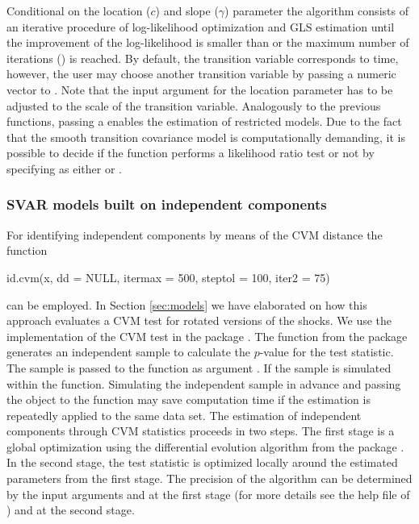 \documentclass[nojss]{jss}\usepackage[]{graphicx}\usepackage[]{color}
\begin{document}
Conditional on the location ($c$) and slope ($\gamma$) parameter the algorithm consists of an iterative procedure of log-likelihood optimization and GLS estimation until the improvement of the log-likelihood is smaller than  or the maximum number of iterations () is reached. By default, the transition variable corresponds to time, however, the user may choose another transition variable by passing a numeric vector to . Note that the input argument for the location parameter has to be adjusted to the scale of the transition variable. Analogously to the previous functions, passing a  enables the estimation of restricted models. Due to the fact that the smooth transition covariance model is computationally demanding, it is possible to decide if the function performs a likelihood ratio test or not by specifying  as either  or .

\subsubsection{SVAR models built on independent components}

{For identifying independent components by means of the CVM distance the function}

\begin{CodeChunk}
	\begin{CodeInput}
id.cvm(x, dd = NULL, itermax = 500, steptol = 100, iter2 = 75)
	\end{CodeInput}
\end{CodeChunk}

can be employed. In Section \ref{sec:models} we have elaborated on how this approach evaluates a CVM test for rotated versions of the shocks. We use the implementation of the CVM test in the package   \citep{copula}. The function   from the  package generates an independent sample to calculate the $p$-value for the test statistic. The sample is passed to the  function  as argument . If  the sample is simulated within the  function. Simulating the independent sample in advance and passing the object to the  function may save computation time if the estimation is repeatedly applied to the same data set. The estimation of independent components through CVM statistics proceeds in two steps. The first stage is a global optimization using the differential evolution algorithm from the  package \citep{DEoptim}. In the second stage, the test statistic is optimized locally around the estimated parameters from the first stage. The precision of the algorithm can be determined by the input arguments  and  at the first stage (for more details see the help file of ) and  at the second stage.
\end{document}
